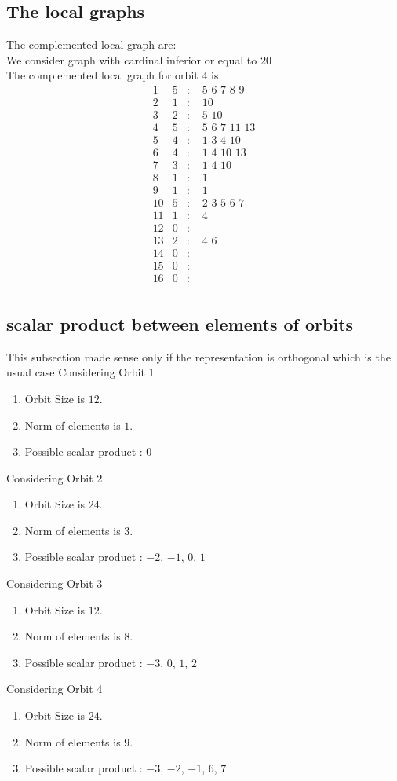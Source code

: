 \documentclass[12pt]{article}
\begin{document}
\subsection{The local graphs}
The complemented local graph are:\\
We consider graph with cardinal inferior or equal to $20$\\
The complemented local graph for orbit $4$ is:
\begin{equation*}
\begin{array}{rrcl}
1&5&:&\,\,5\,\,6\,\,7\,\,8\,\,9\\
2&1&:&\,\,10\\
3&2&:&\,\,5\,\,10\\
4&5&:&\,\,5\,\,6\,\,7\,\,11\,\,13\\
5&4&:&\,\,1\,\,3\,\,4\,\,10\\
6&4&:&\,\,1\,\,4\,\,10\,\,13\\
7&3&:&\,\,1\,\,4\,\,10\\
8&1&:&\,\,1\\
9&1&:&\,\,1\\
10&5&:&\,\,2\,\,3\,\,5\,\,6\,\,7\\
11&1&:&\,\,4\\
12&0&:&\\
13&2&:&\,\,4\,\,6\\
14&0&:&\\
15&0&:&\\
16&0&:&\\
\end{array}
\end{equation*}
\subsection{scalar product between elements of orbits}
\noindent This subsection made sense only if the representation is orthogonal which is the usual case
Considering Orbit 1
\begin{enumerate}
\item Orbit Size is $12$.
\item Norm of elements is $1$.
\item Possible scalar product : $0$
\end{enumerate}
Considering Orbit 2
\begin{enumerate}
\item Orbit Size is $24$.
\item Norm of elements is $3$.
\item Possible scalar product : $-2$, $-1$, $0$, $1$
\end{enumerate}
Considering Orbit 3
\begin{enumerate}
\item Orbit Size is $12$.
\item Norm of elements is $8$.
\item Possible scalar product : $-3$, $0$, $1$, $2$
\end{enumerate}
Considering Orbit 4
\begin{enumerate}
\item Orbit Size is $24$.
\item Norm of elements is $9$.
\item Possible scalar product : $-3$, $-2$, $-1$, $6$, $7$
\end{enumerate}
\end{document}
